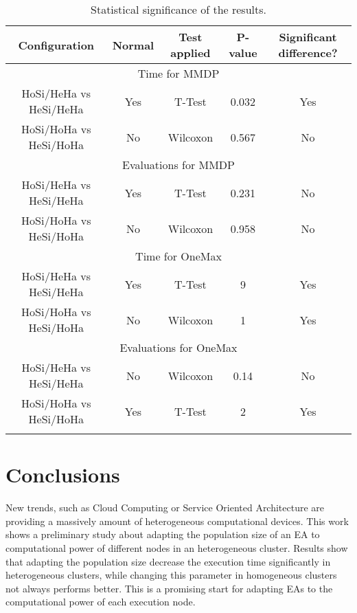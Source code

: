 \begin{table*}
\centering
\caption{Statistical significance of the results.}
\begin{tabular}{|c|c|c|c|c|} \hline
\hline\noalign{\smallskip}
Configuration     &Normal &Test applied     &P-value & Significant difference?\\ \hline
\multicolumn{5}{|c|}{Time for MMDP} \\ \hline
HoSi/HeHa vs HeSi/HeHa  &Yes  &T-Test     & 0.032    & Yes \\ \hline
HoSi/HoHa vs HeSi/HoHa  &No   &Wilcoxon   &0.567   & No \\ \hline \hline
\multicolumn{5}{|c|}{Evaluations for MMDP}  \\ \hline
HoSi/HeHa vs HeSi/HeHa  &Yes  &T-Test     &0.231  & No \\ \hline
HoSi/HoHa vs HeSi/HoHa  &No   &Wilcoxon   &0.958  & No \\ \hline \hline
\multicolumn{5}{|c|}{Time for OneMax} \\ \hline
HoSi/HeHa vs HeSi/HeHa  & Yes & T-Test    &  9\e{-15} & Yes \\ \hline
HoSi/HoHa vs HeSi/HoHa  & No  & Wilcoxon    &   1\e{-6} & Yes \\ \hline \hline
\multicolumn{5}{|c|}{Evaluations for OneMax}  \\ \hline
HoSi/HeHa vs HeSi/HeHa  & No  & Wilcoxon    & 0.14    & No\\ \hline
HoSi/HoHa vs HeSi/HoHa  & Yes & T-Test    & 2\e{-27}  & Yes \\ \hline
\noalign{\smallskip}\hline

\end{tabular}
\label{tab:significance}
\end{table*}





\section{Conclusions}
New trends, such as Cloud Computing or Service Oriented Architecture are providing a massively amount of heterogeneous computational devices. This work shows a preliminary study about adapting the population size of an EA to computational power of different nodes in an heterogeneous cluster. Results show that adapting the population size decrease the execution time significantly in heterogeneous clusters, while changing this parameter in homogeneous clusters not always performs better. This is a promising start for adapting EAs to the computational power of each execution node.

